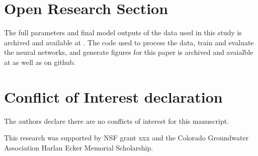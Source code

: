 \documentclass[draft]{agujournal2019}
\begin{document}
%








%
%

\section*{Open Research Section}
The full parameters and final model outputs of the data used in this study is archived and available at .  The code used to process the data, train and evaluate the neural networks, and generate figures for this paper is archived and avaialble at as well as on github.

\section*{Conflict of Interest declaration}
The authors declare there are no conflicts of interest for this manuscript.


\acknowledgments
This research was supported by NSF grant xxx and the Colorado Groundwater Association Harlan Ecker Memorial Scholarship.  
\end{document}
